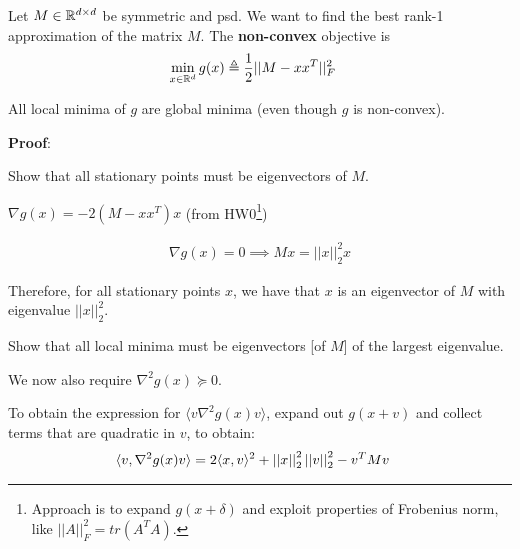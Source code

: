 \documentclass[11pt]{article}
\begin{document}
\begin{example}
	Let $M \in \mathbb{R}^{d \times d}$ be symmetric and psd. We want to find the best rank-1 approximation of the matrix $M$. The \textbf{non-convex} objective is
	\begin{align}
		\min_{x \in \mathbb{R}^d} g(x)
			&\triangleq \frac{1}{2} ||M - xx^T||_F^2 \label{eq:pca-g}
	\end{align}

	\begin{definition}[-1em][Theorem 8.7]
		All local minima of $g$ are global minima (even though $g$ is non-convex). 
	\end{definition}

	\textbf{Proof}:
	\begin{compactenum}
		\item Show that all stationary points must be eigenvectors of $M$. 
		\begin{compactenum}
			\item $\nabla g(x) = - 2 (M - xx^T) x$ (from HW0\footnote{Approach is to expand $g(x + \delta)$ and exploit properties of Frobenius norm, like $||A||_F^2 = tr(A^T A)$.})
			
			\item \begin{align} 
					\nabla g(x) = 0 \implies Mx = ||x||_2^2 x \label{eq:pca-eigvals} 
				\end{align}
			
			\item Therefore, for all stationary points $x$, we have that $x$ is an eigenvector of $M$ with eigenvalue $||x||_2^2$. 
		\end{compactenum}
		
		\item Show that all local minima must be eigenvectors [of $M$] of the largest eigenvalue. 
		\begin{compactenum}
			\item We now also require $\nabla^2 g(x) \succeq 0$. 
			
			\item To obtain the expression for $\langle v \nabla^2 g(x) v \rangle$, expand out $g(x + v)$ and collect terms that are quadratic in $v$, to obtain:
			\begin{align}
				\langle v, \nabla^2 g(x) v \rangle
					&= 2 \langle x, v \rangle^2 + \left|\left| x \right|\right|_{2}^2 \left|\left| v \right|\right|_{2}^2 - v^T M v \label{eq:pca-hessian}
			\end{align}
		

\end{compactenum}
\end{compactenum}
\end{example}
\end{document}
